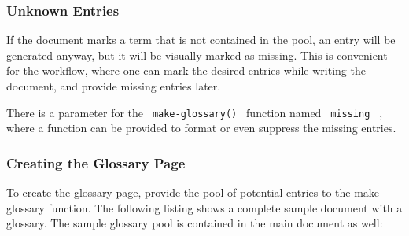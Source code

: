 \subsubsection{Unknown Entries}\label{unknown-entries}

If the document marks a term that is not contained in the pool, an entry
will be generated anyway, but it will be visually marked as missing.
This is convenient for the workflow, where one can mark the desired
entries while writing the document, and provide missing entries later.

There is a parameter for the \texttt{\ make-glossary()\ } function named
\texttt{\ missing\ } , where a function can be provided to format or
even suppress the missing entries.

\subsubsection{Creating the Glossary
Page}\label{creating-the-glossary-page}

To create the glossary page, provide the pool of potential entries to
the make-glossary function. The following listing shows a complete
sample document with a glossary. The sample glossary pool is contained
in the main document as well:

